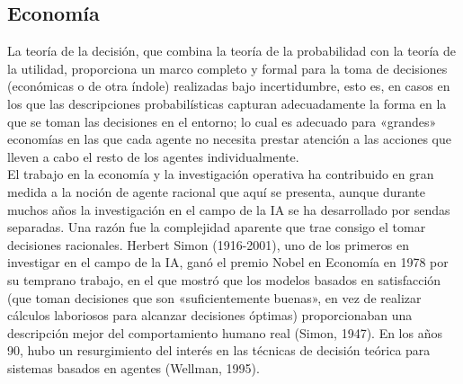 \documentclass[12pt,a4paper]{report}
\begin{document}
\subsection*{Economía}
La teoría de la decisión, que combina la teoría de la probabilidad con la teoría de la utilidad, proporciona un marco completo y formal para la toma de decisiones (económicas o de otra índole) realizadas bajo incertidumbre, esto es, en casos en los que las descripciones probabilísticas capturan adecuadamente la forma en la que se toman las decisiones en el entorno; lo cual es adecuado para «grandes» economías en las que cada agente no necesita prestar atención a las acciones que lleven a cabo el resto de los agentes individualmente.\\
El trabajo en la economía y la investigación operativa ha contribuido en gran medida a la noción de agente racional que aquí se presenta, aunque durante muchos años la investigación en el campo de la IA se ha desarrollado por sendas separadas. Una razón fue la complejidad aparente que trae consigo el tomar decisiones racionales. Herbert Simon (1916-2001), uno de los primeros en investigar en el campo de la IA, ganó el premio Nobel en Economía en 1978 por su temprano trabajo, en el que mostró que los modelos basados en satisfacción (que toman decisiones que son «suficientemente buenas», en vez de realizar cálculos laboriosos para alcanzar decisiones óptimas) proporcionaban una descripción mejor del comportamiento humano real (Simon, 1947). En los años 90, hubo un resurgimiento del interés en las técnicas de decisión teórica para sistemas basados en agentes (Wellman, 1995).
\end{document}
